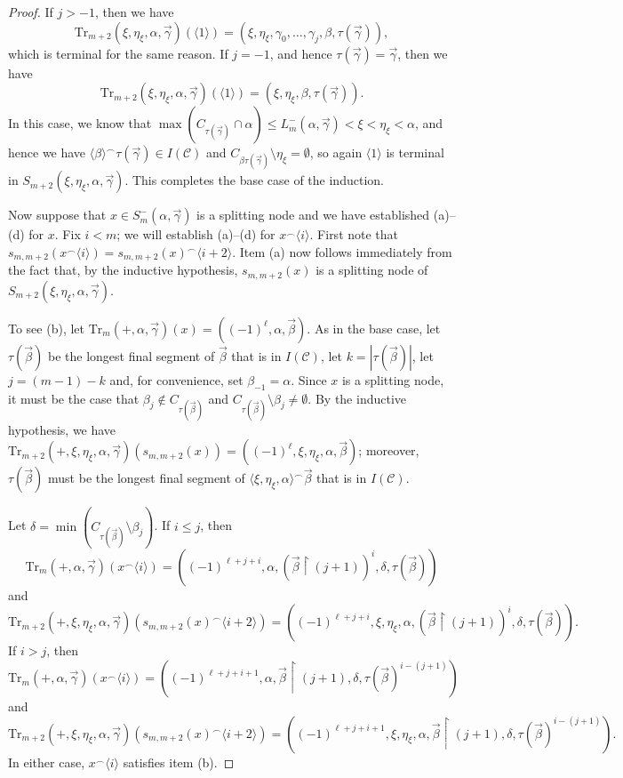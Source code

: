 \documentclass[10pt,a4paper]{amsart}
\newcommand{\mc}{\mathcal}
\begin{document}
\begin{proof}
  If $j > -1$, then we have
  \[
    \mathrm{Tr}_{m+2}(\xi,\eta_\xi,\alpha,\vec{\gamma})(\langle 1 \rangle) = 
    (\xi, \eta_\xi, \gamma_0, \ldots, \gamma_j, \beta, \tau(\vec{\gamma})),
  \]
  which is terminal for the same reason. If $j = -1$, and hence 
  $\tau(\vec{\gamma}) = \vec{\gamma}$, then we have
  \[
    \mathrm{Tr}_{m+2}(\xi,\eta_\xi,\alpha,\vec{\gamma})(\langle 1 \rangle) = 
    (\xi, \eta_\xi, \beta, \tau(\vec{\gamma})).
  \]
  In this case, we know that $\max(C_{\tau(\vec{\gamma})} \cap \alpha) 
  \leq L^-_m(\alpha,\vec{\gamma}) < \xi < \eta_\xi < \alpha$, and hence we have 
  $\langle \beta \rangle ^\smallfrown \tau(\vec{\gamma}) \in I(\mc{C})$ and 
  $C_{\beta \tau(\vec{\gamma})} \setminus \eta_\xi = \emptyset$, so again 
  $\langle 1 \rangle$ is terminal in $S_{m+2}(\xi,\eta_\xi,\alpha,\vec{\gamma})$. 
  This completes the base case of the induction.
  
  Now suppose that $x \in S^-_m(\alpha, \vec{\gamma})$ is a splitting node and 
  we have established (a)--(d) for $x$. Fix $i < m$; we will establish 
  (a)--(d) for $x^\smallfrown \langle i \rangle$. First note that 
  $s_{m,m+2}(x^\smallfrown \langle i \rangle) = s_{m,m+2}(x)^\smallfrown \langle i+2 \rangle$. 
  Item (a) now follows immediately from the fact that, by the inductive hypothesis, 
  $s_{m,m+2}(x)$ is a splitting node of $S_{m+2}(\xi,\eta_\xi,\alpha,\vec{\gamma})$.
  
  To see (b), let $\mathrm{Tr}_m(+,\alpha,\vec{\gamma})(x) = ((-1)^\ell, \alpha, 
  \vec{\beta})$. As in the base case, let $\tau(\vec{\beta})$ be the longest final 
  segment of $\vec{\beta}$ that is in $I(\mc{C})$, let $k = |\tau(\vec{\beta})|$, 
  let $j = (m-1)-k$ and, for convenience, set $\beta_{-1} = \alpha$. Since $x$ is a 
  splitting node, it must be the case that $\beta_j \notin C_{\tau(\vec{\beta})}$ 
  and $C_{\tau(\vec{\beta})} \setminus \beta_j \neq \emptyset$. By the inductive 
  hypothesis, we have $\mathrm{Tr}_{m+2}(+,\xi,\eta_\xi,\alpha,\vec{\gamma})
  (s_{m,m+2}(x)) = ((-1)^\ell, \xi, \eta_\xi, \alpha, \vec{\beta})$; moreover, $\tau(\vec{\beta})$ 
  must be the longest final segment of $\langle \xi,\eta_\xi,\alpha \rangle^\frown \vec{\beta}$ 
  that is in $I(\mc{C})$.
  
  Let $\delta = \min(C_{\tau(\vec{\beta})} \setminus \beta_j)$. If $i \leq j$, then 
  \[
    \mathrm{Tr}_m(+,\alpha,\vec{\gamma})(x^\smallfrown \langle i \rangle) = 
    ((-1)^{\ell+j+i},\alpha, (\vec{\beta} \restriction (j+1))^i, \delta, \tau(\vec{\beta}))
  \]
  and 
  \[
    \mathrm{Tr}_{m+2}(+,\xi,\eta_\xi,\alpha,\vec{\gamma})(s_{m,m+2}(x)^\smallfrown 
    \langle i+2 \rangle) = ((-1)^{\ell+j+i}, \xi,\eta_\xi,\alpha, (\vec{\beta} \restriction (j+1))^i, 
    \delta, \tau(\vec{\beta})).
  \]
  If $i > j$, then 
  \[
    \mathrm{Tr}_m(+,\alpha,\vec{\gamma})(x^\smallfrown \langle i \rangle) = 
    ((-1)^{\ell+j+i+1}, \alpha, \vec{\beta} \restriction (j+1), \delta, \tau(\vec{\beta})^{i-(j+1)})
  \]
  and 
  \[
    \mathrm{Tr}_{m+2}(+,\xi,\eta_\xi,\alpha,\vec{\gamma})(s_{m,m+2}(x)^\smallfrown 
    \langle i+2 \rangle) = ((-1)^{\ell+j+i+1}, \xi,\eta_\xi,\alpha, \vec{\beta} \restriction (j+1), 
    \delta, \tau(\vec{\beta})^{i-(j+1)}).
  \]
  In either case, $x^\smallfrown \langle i \rangle$ satisfies item (b).
  

\end{proof}
\end{document}
